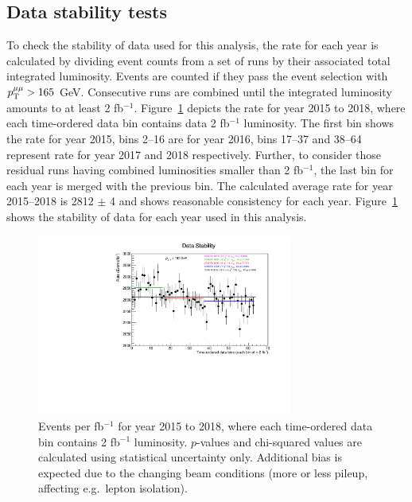 \subsection{Data stability tests}
\label{sec:data-stability}
To check the stability of data used for this analysis, the rate for each year is calculated by dividing event counts from a set of runs by their associated total integrated luminosity. Events are counted if they pass the event selection with $p_\mathrm{T}^{\mu\mu}>165$ GeV. Consecutive runs are combined until the integrated luminosity amounts to at least 2 fb$^{-1}$. Figure~\ref{fig:DataStability} depicts the rate for year 2015 to 2018, where each time-ordered data bin contains data 2 fb$^{-1}$ luminosity. The first bin shows the rate for year 2015, bins 2--16 are for year 2016, bins 17--37 and 38--64 represent rate for year 2017 and 2018 respectively. Further, to consider those residual runs having combined luminosities smaller than 2 fb$^{-1}$, the last bin for each year is merged with the previous bin. The calculated average rate for year 2015--2018 is 2812 $\pm$ 4 and shows reasonable consistency for each year. Figure~\ref{fig:DataStability} shows the stability of data for each year used in this analysis.
\begin{figure}[h!]
  \centering
  \includegraphics[width=0.75\textwidth]{figures/DataStability.pdf}
  \caption{Events per fb$^{-1}$ for year 2015 to 2018, where each time-ordered data bin contains 2 fb$^{-1}$ luminosity.
    $p$-values and chi-squared values are calculated using statistical uncertainty only. Additional bias is expected due to the changing beam conditions (more or less pileup, affecting e.g.\ lepton isolation).
  }
  \label{fig:DataStability}
\end{figure}

